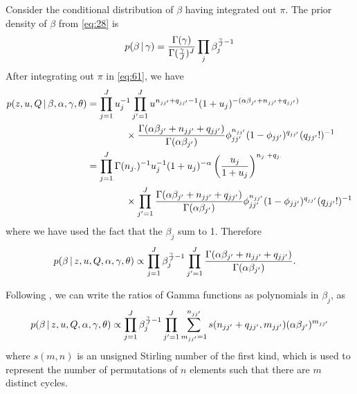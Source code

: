 Consider the conditional distribution of $\beta$ having
integrated out $\pi$.  The prior density of $\beta$ from
\eqref{eq:28} is
\begin{equation}
  \label{eq:62}
  p(\beta \, \vert \, \gamma) =
  \frac{\Gamma(\gamma)}{\Gamma(\frac{\gamma}{J})^J} \prod_{j}
  \beta_j^{\frac{\gamma}{J} - 1}
\end{equation}
After integrating out $\pi$ in \eqref{eq:61}, we have
\begin{align}
  p(z, u, Q \, \vert \, \beta, \alpha, \gamma, \theta) &=
  \prod_{j=1}^J u_{j} ^{-1}
  \prod_{j'=1}^J u^{n_{jj'} + q_{jj'} - 1}(1 +
  u_j)^{-(\alpha\beta_{j'} + n_{jj'} + q_{jj'})}
  \\
  &\qquad \qquad \times \frac{\Gamma(\alpha\beta_{j'} + n_{jj'} +
    q_{jj'})}{\Gamma(\alpha\beta_{j'})} \phi_{jj'}^{n_{jj'}}(1-\phi_{jj'})^{q_{jj'}}
  (q_{jj'}!)^{-1} \\
  &= \prod_{j=1}^J \Gamma(n_{j\cdot})^{-1} u_j^{-1}(1+u_j)^{-\alpha}
  \left(\frac{u_j}{1+u_j}\right)^{n_{j\cdot} + q_{j\cdot}} \\ &\qquad
  \qquad \times \prod_{j' =
    1}^J \frac{\Gamma(\alpha\beta_{j'} + n_{jj'} +
    q_{jj'})}{\Gamma(\alpha\beta_{j'})} \phi_{jj'}^{n_{jj'}}(1-\phi_{jj'})^{q_{jj'}}
  (q_{jj'}!)^{-1}
\end{align}
 where we have used the fact that the $\beta_j$ sum to 1.  Therefore
\begin{align}
  p(\beta \, \vert \, z, u, Q, \alpha, \gamma, \theta) &\propto \prod_{j=1}^J
  \beta_j^{\frac{\gamma}{J} - 1} \prod_{j'=1}^J \frac{\Gamma(\alpha\beta_{j'} +
    n_{jj'} + q_{jj'})}{\Gamma(\alpha\beta_{j'})}.
\end{align}

Following \citep{teh2006hierarchical}, we can write the ratios of Gamma functions
as polynomials in $\beta_j$, as
\begin{equation}
  \label{eq:31}
  p(\beta \, \vert \, z, u, Q, \alpha, \gamma, \theta) \propto \prod_{j=1}^J
  \beta_j^{\frac{\gamma}{J} - 1} \prod_{j'=1}^{J} \sum_{m_{jj'} = 1}^{n_{jj'}}
  s(n_{jj'} + q_{jj'}, m_{jj'}) (\alpha \beta_{j'})^{m_{jj'}}
\end{equation}
where $s(m,n)$ is an unsigned Stirling number of the first kind, which
is used to represent the number of permutations of $n$ elements such that there are
$m$ distinct cycles.

